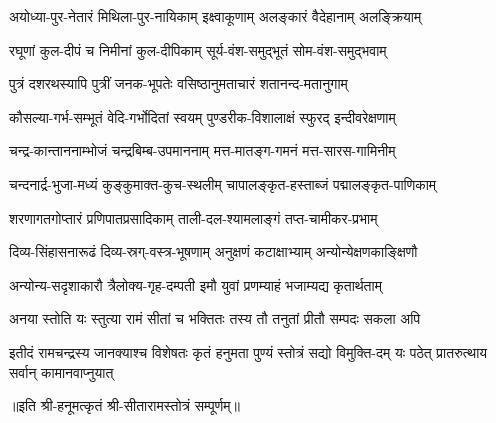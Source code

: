 

\twolineshloka
{अयोध्या-पुर-नेतारं मिथिला-पुर-नायिकाम्}
{इक्ष्वाकूणाम् अलङ्कारं वैदेहानाम् अलङ्क्रियाम्} %

\twolineshloka
{रघूणां कुल-दीपं च निमीनां कुल-दीपिकाम्}
{सूर्य-वंश-समुद्भूतं सोम-वंश-समुद्भवाम्} %

\twolineshloka
{पुत्रं दशरथस्यापि पुत्रीं जनक-भूपतेः}
{वसिष्ठानुमताचारं शतानन्द-मतानुगाम्} %

\twolineshloka
{कौसल्या-गर्भ-सम्भूतं वेदि-गर्भोदितां स्वयम्}
{पुण्डरीक-विशालाक्षं स्फुरद् इन्दीवरेक्षणाम्} %

\twolineshloka
{चन्द्र-कान्ताननाम्भोजं चन्द्रबिम्ब-उपमाननाम्}
{मत्त-मातङ्ग-गमनं मत्त-सारस-गामिनीम्}

\twolineshloka
{चन्दनार्द्र-भुजा-मध्यं कुङ्कुमाक्त-कुच-स्थलीम्}
{चापालङ्कृत-हस्ताब्जं पद्मालङ्कृत-पाणिकाम्} %

\twolineshloka
{शरणागतगोप्तारं प्रणिपातप्रसादिकाम्}
{ताली-दल-श्यामलाङ्गं तप्त-चामीकर-प्रभाम्} %

\twolineshloka
{दिव्य-सिंहासनारूढं दिव्य-स्रग्-वस्त्र-भूषणाम्} %
{अनुक्षणं कटाक्षाभ्याम् अन्योन्येक्षणकाङ्क्षिणौ}

\twolineshloka
{अन्योन्य-सदृशाकारौ त्रैलोक्य-गृह-दम्पती}
{इमौ युवां प्रणम्याहं भजाम्यद्य कृतार्थताम्} %

\twolineshloka
{अनया स्तोति यः स्तुत्या रामं सीतां च भक्तितः}
{तस्य तौ तनुतां प्रीतौ सम्पदः सकला अपि} %

\threelineshloka
{इतीदं रामचन्द्रस्य जानक्याश्च विशेषतः}
{कृतं हनुमता पुण्यं स्तोत्रं सद्यो विमुक्ति-दम्}
{यः पठेत् प्रातरुत्थाय सर्वान् कामानवाप्नुयात्} %

॥इति श्री-हनूमत्कृतं श्री-सीतारामस्तोत्रं सम्पूर्णम्॥
